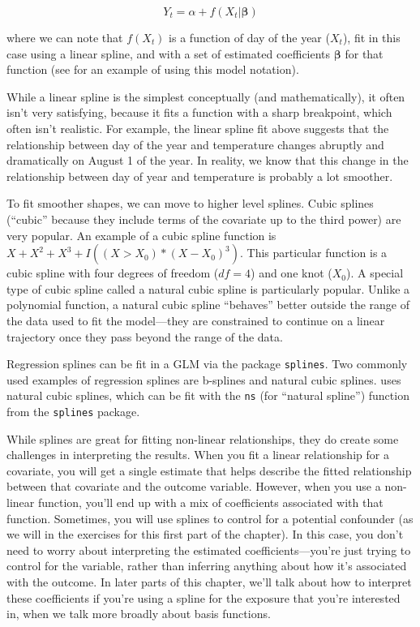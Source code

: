 \documentclass[
]{book}
\begin{document}
\[
Y_t = \alpha + f(X_t | \mathbf{\beta})
\]

where we can note that \(f(X_t)\) is a function of day of the year (\(X_t\)), fit in
this case using a linear spline, and with a set of estimated coefficients \(\mathbf{\beta}\) for that
function (see \citet{armstrong2006models} for an example of using this model notation).

While a linear spline is the simplest conceptually (and mathematically), it often
isn't very satisfying, because it fits a function with a sharp breakpoint, which
often isn't realistic. For example, the linear spline fit above suggests that the
relationship between day of the year and temperature changes abruptly and dramatically
on August 1 of the year. In reality, we know that this change in the relationship
between day of year and temperature is probably a lot smoother.

To fit smoother shapes, we can move to higher level splines. Cubic splines
(``cubic'' because they include terms of the covariate up to the third power) are
very popular.
An example of a cubic spline
function is \(X+X^{2}+X^{3}+I((X>X_{0})*(X-X_{0})^3)\). This particular function is
a cubic spline with four degrees of freedom (\(df=4\)) and one knot (\(X_{0}\)).
A special type of cubic spline called a natural cubic spline is particularly popular.
Unlike a polynomial function, a natural cubic spline ``behaves'' better outside
the range of the data used to fit the model---they are constrained to continue
on a linear trajectory once they pass beyond the range of the data.

Regression splines can be fit in a GLM via the package \texttt{splines}. Two commonly
used examples of regression splines are b-splines and natural cubic
splines. \citet{vicedo2019hands} uses natural cubic splines, which can be fit with the
\texttt{ns} (for ``natural spline'') function from the \texttt{splines} package.

While splines are great for fitting non-linear relationships, they do create some
challenges in interpreting the results. When you fit a linear relationship for
a covariate, you will get a single estimate that helps describe the fitted relationship
between that covariate and the outcome variable. However, when you use a non-linear
function, you'll end up with a mix of coefficients associated with that function.
Sometimes, you will use splines to control for a potential confounder (as we
will in the exercises for this first part of the chapter). In this case, you don't
need to worry about interpreting the estimated coefficients---you're just trying to
control for the variable, rather than inferring anything about how it's associated
with the outcome.
In later parts of this chapter, we'll talk about how to interpret these coefficients
if you're using a spline for the exposure that you're interested in, when we talk
more broadly about basis functions.
\end{document}
